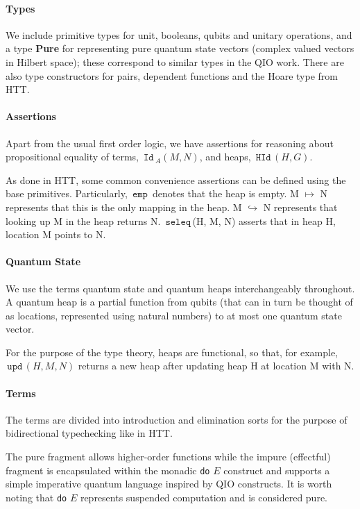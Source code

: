 \documentclass[acmsmall,nonacm,timestamp]{acmart}
\newcommand{\type}[1]{\textrm{\textbf{#1}}}
\newcommand{\kw}[1]{\,\mathrm{\texttt{#1}}\,}
\begin{document}
\paragraph{Types} We include primitive types for unit, booleans, qubits and unitary operations, and a type \type{Pure} for representing pure quantum state vectors (complex valued vectors in Hilbert space); these correspond to similar types in the QIO work. There are also type constructors for pairs, dependent functions and the Hoare type from HTT.

\paragraph{Assertions}
Apart from the usual first order logic, we have assertions for reasoning about propositional equality of terms, $\kw{Id}_A(M, N)$, and heaps, $\kw{HId}(H, G)$.

As done in HTT, some common convenience assertions can be defined using the base primitives. Particularly, $\kw{emp}$ denotes that the heap is empty. M $\mapsto$ N represents that this is the only mapping in the heap. M $\hookrightarrow$ N represents that looking up M in the heap returns N. $\kw{seleq}$(H, M, N) asserts that in heap H, location M points to N.

\paragraph{Quantum State}

We use the terms quantum state and quantum heaps interchangeably throughout. A quantum heap is a partial function from qubits (that can in turn be thought of as locations, represented using natural numbers) to at most one quantum state vector.

For the purpose of the type theory, heaps are functional, so that, for example, $\kw{upd}(H, M, N)$ returns a new heap after updating heap H at location M with N.

\paragraph{Terms}
The terms are divided into introduction and elimination sorts for the purpose of bidirectional typechecking like in HTT.

The pure fragment allows higher-order functions while the impure (effectful) fragment is encapsulated within the monadic \texttt{do} $E$ construct and supports a simple imperative quantum language inspired by QIO constructs. It is worth noting that \texttt{do} $E$ represents suspended computation and is considered pure.
\end{document}
